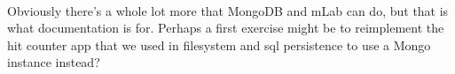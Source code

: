 \documentclass[10pt, a4paper, twosize]{article}
\begin{document}
\paragraph{} Obviously there's a whole lot more that MongoDB and mLab can do, but that is what documentation is for. Perhaps a first exercise might be to reimplement the hit counter app that we used in filesystem and sql persistence to use a Mongo instance instead?
\end{document}
